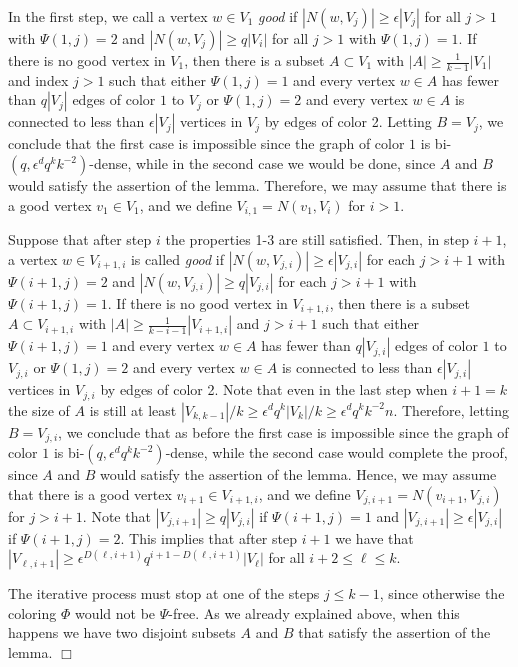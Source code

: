 \documentclass[11pt]{article}
\newenvironment{proof}
      {\medskip\noindent{\bf Proof.}\hspace{1mm}}
      {\hfill$\Box$\medskip}
\begin{document}
\begin{proof}
In the first step, we call a vertex $w\in V_1$ {\it good} if
$|N(w,V_j)| \geq \epsilon|V_j|$ for all $j>1$ with $\Psi(1,j) =2$
and $|N(w,V_j)| \geq q|V_i|$ for all $j>1$ with $\Psi(1,j)=1$. If
there is no good vertex in $V_1$, then there is a subset $A \subset
V_1$ with $|A|\geq \frac{1}{k-1}|V_1|$ and index $j >1$ such that
either $\Psi(1,j)=1$ and every vertex $w \in A$ has fewer than
$q|V_j|$ edges of color $1$ to $V_j$ or $\Psi(1,j)=2$ and
every vertex $w \in A$ is connected to less than $\epsilon|V_j|$
vertices in $V_j$ by edges of color 2. Letting $B=V_j$, we conclude
that the first case is impossible since the graph of color $1$ is
bi-$(q,\epsilon^dq^{k}k^{-2})$-dense, while in the second case we
would be done, since $A$ and $B$ would satisfy the assertion of the
lemma. Therefore, we may assume that there is a good vertex $v_1 \in
V_1$, and we define $V_{i,1}=N(v_1,V_i)$ for $i>1$.

Suppose that after step $i$ the properties 1-3 are still satisfied.
Then, in step $i+1$, a vertex $w \in V_{i+1,i}$ is called {\it
good} if $|N(w,V_{j,i})| \geq \epsilon|V_{j,i}|$ for each $j> i+1$
with $\Psi(i+1,j) =2$ and $|N(w,V_{j,i})| \geq q|V_{j,i}|$ for each
$j >i+1$ with $\Psi(i+1,j) =1$. If there is no good vertex in
$V_{i+1,i}$, then there is a subset $A \subset V_{i+1,i}$ with
$|A|\geq \frac{1}{k-i-1}|V_{i+1,i}|$ and $j >i+1$ such that either
$\Psi(i+1,j)=1$ and every vertex $w \in A$ has fewer than
$q|V_{j,i}|$ edges of color $1$ to $V_{j,i}$ or
$\Psi(1,j)=2$ and every vertex $w \in A$ is connected to less than
 $\epsilon|V_{j,i}|$ vertices in $V_{j,i}$ by edges of color
2. Note that even in the last step when $i+1=k$ the size of $A$ is
still at least $|V_{k,k-1}|/k\geq \epsilon^dq^k|V_k|/k\geq
\epsilon^dq^kk^{-2}n$. Therefore, letting $B=V_{j,i}$, we conclude
that as before the first case is impossible since the graph of color
$1$ is bi-$(q,\epsilon^dq^{k}k^{-2})$-dense, while the second case
would complete the proof,  since $A$ and $B$ would satisfy the
assertion of the lemma. Hence, we may assume that there is a good
vertex $v_{i+1} \in V_{i+1,i}$, and we define
$V_{j,i+1}=N(v_{i+1},V_{j,i})$ for $j >i+1$.
Note that $|V_{j,i+1}| \geq q|V_{j,i}|$ if $\Psi(i+1,j) =1$
and $|V_{j,i+1}| \geq \epsilon |V_{j,i}|$ if $\Psi(i+1,j) =2$.
This implies that after step $i+1$ we have
that $|V_{\ell,i+1}| \geq
\epsilon^{D(\ell,i+1)}q^{i+1-D(\ell,i+1)}|V_{\ell}|$ for all $i+2
\leq \ell \leq k$.


The iterative process must stop at one of the steps $j \leq k-1$,
since otherwise the coloring $\Phi$ would not be $\Psi$-free.
As we already explained above, when this happens we have two disjoint subsets $A$ and $B$
that satisfy the assertion of the lemma.
\end{proof}
\end{document}
